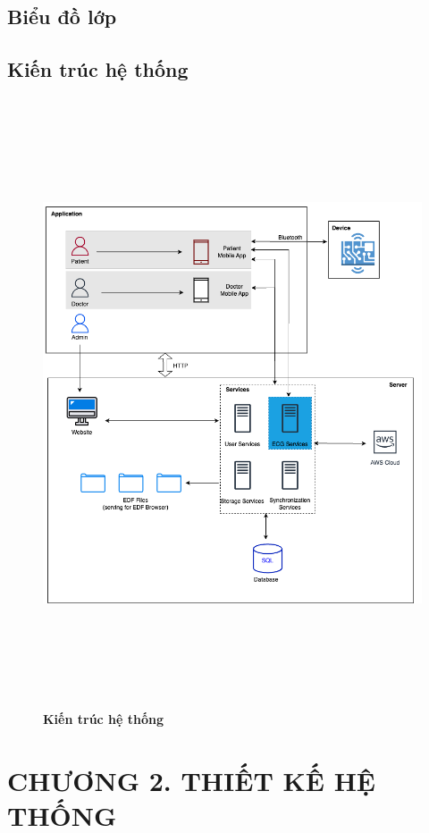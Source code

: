 \documentclass{article}%
\begin{document}
\subsection{Biểu đồ lớp}
\subsection{Kiến trúc hệ thống}


\begin{figure}[H]
     \centering
     \includegraphics[width=16cm,height=18cm]{Images/fmECG_architecture-System Architecture.drawio.png}
     \caption[Kiến trúc hệ thống]{\bfseries \fontsize{12pt}{0pt}\selectfont Kiến trúc hệ thống}
     \label{hinh21} %
\end{figure}

\newpage

\section*{CHƯƠNG 2. THIẾT KẾ HỆ THỐNG}
\setcounter{section}{2}
\setcounter{subsection}{0} %
\setcounter{table}{0} %
\setcounter{figure}{0} %
\end{document}
